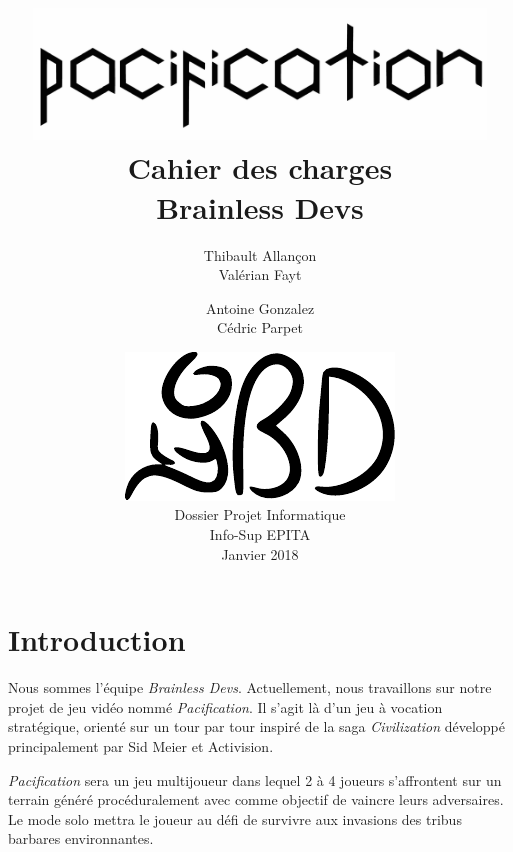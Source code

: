 \documentclass[12pt]{report}
\begin{document}
\title{
	{\vspace{3em}\protect\centering\protect\includegraphics[width=0.9\textwidth]{pacification_vector.pdf}}\\
	{\vspace{4em}\Huge Cahier des charges}\\
	{\large Brainless Devs}
}
\author{
	Thibault Allançon\\
	Valérian Fayt
	\and
	Antoine Gonzalez\\
	Cédric Parpet}
\date{
	{\vfill\protect\centering\protect\includegraphics{brainless_devs.pdf}}\\
	Dossier Projet Informatique\\
	Info-Sup EPITA\\
	Janvier 2018
}

\maketitle
\tableofcontents

\chapter{Introduction}

Nous sommes l’équipe \textit{Brainless Devs}. Actuellement, nous travaillons sur notre projet de jeu vidéo nommé \textit{Pacification}. Il s'agit là d'un jeu à vocation stratégique, orienté sur un tour par tour inspiré de la saga \textit{Civilization} développé principalement par Sid Meier et Activision.

\textit{Pacification} sera un jeu multijoueur dans lequel 2 à 4 joueurs s'affrontent sur un terrain généré procéduralement avec comme objectif de vaincre leurs adversaires. Le mode solo mettra le joueur au défi de survivre aux invasions des tribus barbares environnantes.
\end{document}
